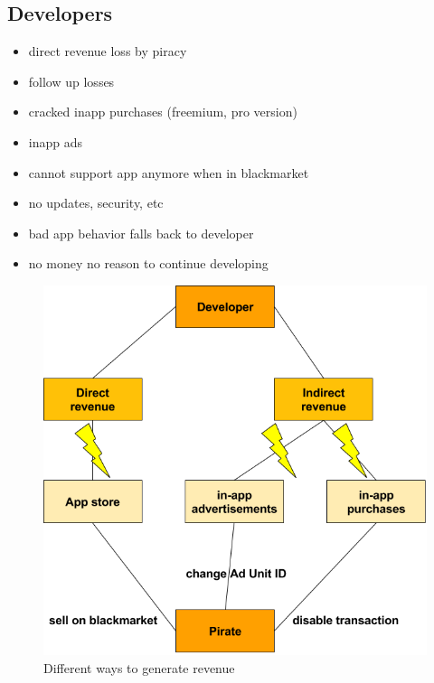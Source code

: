 \subsection{Developers} \label{subsection:foundation-piracy-developers}
\begin{itemize}
  \item direct revenue loss by piracy
  \item follow up losses
  \item cracked inapp purchases (freemium, pro version)
  \item inapp ads
  \item cannot support app anymore when in blackmarket
  \item no updates, security, etc
  \item bad app behavior falls back to developer
  \item no money no reason to continue developing
\end{itemize}
\begin{figure}[h]
    \centering
    \includegraphics[width=1\textwidth]{data/revenue.png}
    \caption{Different ways to generate revenue}
    \label{fig:revenue}
\end{figure}
